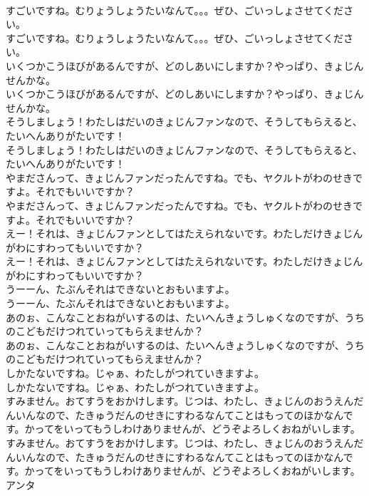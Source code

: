 \documentclass[8pt]{extreport}
\begin{document}
\begin{CJK}{UTF8}{min}
\\	すごいですね。むりょうしょうたいなんて。。。ぜひ、ごいっしょさせてください。	
\\	すごいですね。むりょうしょうたいなんて。。。ぜひ、ごいっしょさせてください。 
\\	いくつかこうほびがあるんですが、どのしあいにしますか？やっぱり、きょじんせんかな。	
\\	いくつかこうほびがあるんですが、どのしあいにしますか？やっぱり、きょじんせんかな。 
\\	そうしましょう！わたしはだいのきょじんファンなので、そうしてもらえると、たいへんありがたいです！	
\\	そうしましょう！わたしはだいのきょじんファンなので、そうしてもらえると、たいへんありがたいです！ 
\\	やまださんって、きょじんファンだったんですね。でも、ヤクルトがわのせきですよ。それでもいいですか？	
\\	やまださんって、きょじんファンだったんですね。でも、ヤクルトがわのせきですよ。それでもいいですか？ 
\\	えー！それは、きょじんファンとしてはたえられないです。わたしだけきょじんがわにすわってもいいですか？	
\\	えー！それは、きょじんファンとしてはたえられないです。わたしだけきょじんがわにすわってもいいですか？ 
\\	うーーん、たぶんそれはできないとおもいますよ。	
\\	うーーん、たぶんそれはできないとおもいますよ。 
\\	あのぉ、こんなことおねがいするのは、たいへんきょうしゅくなのですが、うちのこどもだけつれていってもらえませんか？	
\\	あのぉ、こんなことおねがいするのは、たいへんきょうしゅくなのですが、うちのこどもだけつれていってもらえませんか？ 
\\	しかたないですね。じゃぁ、わたしがつれていきますよ。	
\\	しかたないですね。じゃぁ、わたしがつれていきますよ。 
\\	すみません。おてすうをおかけします。じつは、わたし、きょじんのおうえんだんいんなので、たきゅうだんのせきにすわるなんてことはもってのほかなんです。かってをいってもうしわけありませんが、どうぞよろしくおねがいします。	
\\	すみません。おてすうをおかけします。じつは、わたし、きょじんのおうえんだんいんなので、たきゅうだんのせきにすわるなんてことはもってのほかなんです。かってをいってもうしわけありませんが、どうぞよろしくおねがいします。 
\\	アンタ

\end{CJK}
\end{document}
